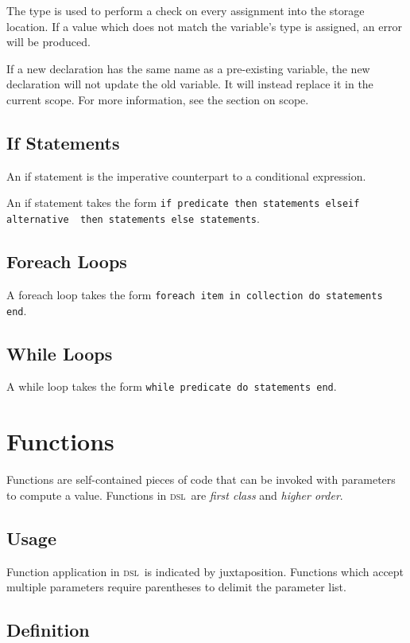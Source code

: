 \documentclass[11pt]{article}
\newcommand{\DSL}{{\scshape dsl}}
\newcommand{\literal}[1]{\lstinline[style=DSL,identifierstyle=\itshape]!#1!}
\begin{document}
The type is used to perform a check on every assignment into the
storage location.  If a value which does not match the variable's type
is assigned, an error will be produced.

If a new declaration has the same name as a pre-existing variable, the
new declaration will not update the old variable.  It will instead
replace it in the current scope.  For more information, see the
section on scope.

\subsection{If Statements}

An if statement is the imperative counterpart to a conditional
expression.

An if statement takes the form \literal{if predicate then statements elseif alternative 
then statements else statements}.


\subsection{Foreach Loops}

A foreach loop takes the form \literal{foreach item in collection do statements end}.

\subsection{While Loops}

A while loop takes the form \literal{while predicate do statements end}.

\newpage
\section {Functions}

Functions are self-contained pieces of code that can be invoked with parameters to compute a value.
Functions in \DSL\ are {\it first class} and {\it higher order}.

\subsection{Usage}

Function application in \DSL\ is indicated by juxtaposition.
Functions which accept multiple parameters require parentheses to delimit the parameter list.

\subsection{Definition}
\end{document}
